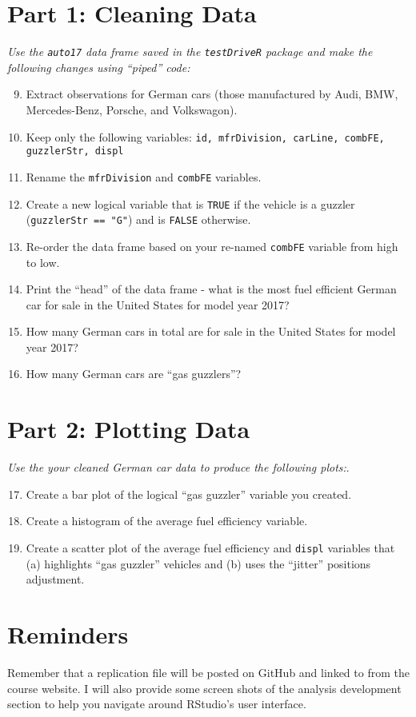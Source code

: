 \documentclass{tufte-handout}
\begin{document}
\vspace{5mm}
\section{Part 1: Cleaning Data}
\textit{Use the \texttt{auto17} data frame saved in the \texttt{testDriveR} package and make the following changes using ``piped'' code:}
\begin{enumerate}
\setcounter{enumi}{8}
\item Extract observations for German cars (those manufactured by Audi, BMW, Mercedes-Benz, Porsche, and Volkswagon). 
\item Keep only the following variables: \texttt{id, mfrDivision, carLine, combFE, guzzlerStr, displ}
\item Rename the \texttt{mfrDivision} and \texttt{combFE} variables.
\item Create a new logical variable that is \texttt{TRUE} if the vehicle is a guzzler (\texttt{guzzlerStr == "G"}) and is \texttt{FALSE} otherwise.
\item Re-order the data frame based on your re-named \texttt{combFE} variable from high to low.
\item Print the ``head'' of the data frame - what is the most fuel efficient German car for sale in the United States for model year 2017?
\item How many German cars in total are for sale in the United States for model year 2017?
\item How many German cars are ``gas guzzlers''?
\end{enumerate}

\vspace{5mm}
\section{Part 2: Plotting Data}
\textit{Use the your cleaned German car data to produce the following plots:}.
\begin{enumerate}
\setcounter{enumi}{16}
\item Create a bar plot of the logical ``gas guzzler'' variable you created.
\item Create a histogram of the average fuel efficiency variable.
\item Create a scatter plot of the average fuel efficiency and \texttt{displ} variables that (a) highlights ``gas guzzler'' vehicles and (b) uses the ``jitter'' positions adjustment.
\end{enumerate}

\vspace{5mm}
\section{Reminders}
Remember that a replication file will be posted on GitHub and linked to from the course website. I will also provide some screen shots of the analysis development section to help you navigate around RStudio's user interface.

\end{document}
